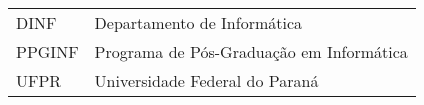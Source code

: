 

\begin{listaacron}

\begin{tabular}{ll}
DINF & Departamento de Informática\\
PPGINF & Programa de Pós-Graduação em Informática\\
UFPR & Universidade Federal do Paraná\\
\end{tabular}

\end{listaacron}


